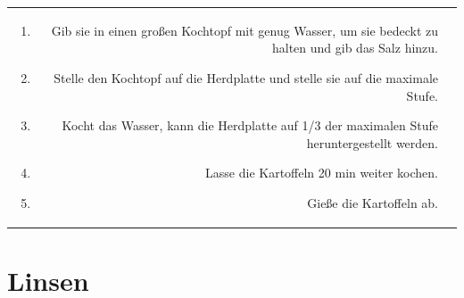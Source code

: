 \documentclass[a4paper, 12pt]{scrbook} 								%
\numberwithin{equation}{section} 									%
\begin{document}
\begin{tabularx}{\textwidth}{r|L}
\begin{enumerate}[]
										\item Gib sie in einen großen Kochtopf mit genug Wasser, um sie bedeckt zu halten und gib das Salz hinzu.
										\item Stelle den Kochtopf auf die Herdplatte und stelle sie auf die maximale Stufe.
										\item Kocht das Wasser, kann die Herdplatte auf 1/3 der maximalen Stufe heruntergestellt werden.
										\item Lasse die Kartoffeln 20 min weiter kochen.
										\item Gieße die Kartoffeln ab.
									\end{enumerate}	\\
	\end{tabularx}
	\newpage


	\section{Linsen}
\end{document}
